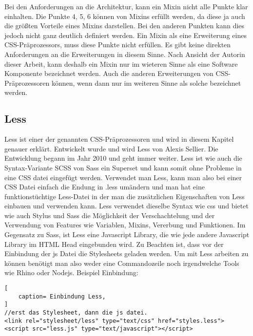 Bei den Anforderungen an die Architektur, kann ein Mixin nicht alle Punkte klar einhalten. Die Punkte 4, 5, 6 können von Mixins erfüllt werden, da diese ja auch die größten Vorteile eines Mixins darstellen. Bei den anderen Punkten kann dies jedoch nicht ganz deutlich definiert werden. \newline
Ein Mixin als eine Erweiterung eines CSS-Präprozessors, muss diese Punkte nicht erfüllen. Es gibt keine direkten Anforderungen an die Erweiterungen in diesem Sinne.\newline
Nach Ansicht der Autorin dieser Arbeit, kann deshalb ein Mixin nur im wieteren Sinne als eine Software Komponente bezeichnet werden. Auch die anderen Erweiterungen von CSS-Präprozessoren können, wenn dann nur im weiteren Sinne als solche bezeichnet werden.
\newpage
\subsection{Less}
Less ist einer der genannten CSS-Präprozessoren und wird in diesem Kapitel genauer erklärt.\newline
Entwickelt wurde und wird Less von Alexis Sellier. Die Entwicklung begann im Jahr 2010 und geht immer weiter.\newline
Less ist wie auch die Syntax-Variante SCSS von Sass ein Superset und kann somit ohne Probleme in eine CSS datei eingefügt werden. Verwendet man Less, kann man also bei einer CSS Datei einfach die Endung in .less umändern und man hat eine funktionstüchtige Less-Datei in der man die zusätzlichen Eigenschaften von Less einbauen und verwenden kann. \newline
Less verwendet dieselbe Syntax wie css und bietet wie auch Stylus und Sass die Möglichkeit der Verschachtelung und der Verwendung von Features wie Variablen, Mixins, Vererbung und Funktionen.\newline
Im Gegensatz zu Sass, ist Less eine Javascript Library, die wie jede andere Javascript Library im HTML Head eingebunden wird. Zu Beachten ist, dass vor der Einbindung der js Datei die Stylesheets geladen werden. \newline
Um mit Less arbeiten zu können benötigt man also weder eine Commandozeile noch irgendwelche Tools wie Rhino oder Nodejs.
Beispiel Einbindung:
\begin{lstlisting}[
	caption= Einbindung Less,
]
//erst das Stylesheet, dann die js datei.
<link rel="stylesheet/less" type="text/css" href="styles.less">
<script src="less.js" type="text/javascript"></script>    
\end{lstlisting}
